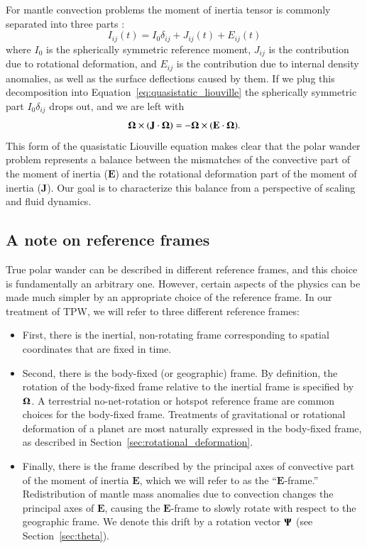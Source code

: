 \documentclass[preprint,12pt,authoryear]{elsarticle}
\newcommand{\mitbf}[1]{\hbox{\mathversion{bold}$#1$}}
\begin{document}
For mantle convection problems the moment of inertia tensor is commonly separated into three parts \citep{sabadini1981pleistocene, spada1992excitation}:
\begin{equation}
I_{ij}(t) = I_0 \delta_{ij} + J_{ij}(t) + E_{ij}(t)
\label{eq:separation}
\end{equation}
where $I_0$ is the spherically symmetric reference moment, $J_{ij}$ is the contribution due to rotational deformation, and $E_{ij}$ is the contribution due to internal density anomalies, as well as the surface deflections caused by them.
If we plug this decomposition into Equation~\eqref{eq:quasistatic_liouville} the spherically symmetric part $I_0 \delta_{ij}$ drops out, and we are left with
\begin{equation}
\mathbf{\Omega} \times (\mathbf{J} \cdot \mitbf{\Omega}) = -\mitbf{\Omega} \times ( \mathbf{E} \cdot \mitbf{\Omega} ).
\label{eq:disequilibrium}
\end{equation}
This form of the quasistatic Liouville equation makes clear that the polar wander problem represents a balance between the mismatches
of the convective part of the moment of inertia ($\mathbf{E}$) and the rotational deformation part of the moment of inertia ($\mathbf{J}$).
Our goal is to characterize this balance from a perspective of scaling and fluid dynamics.

\subsection{A note on reference frames}
\label{sec:reference_frames}
True polar wander can be described in different reference frames, and this choice is fundamentally an arbitrary one.
However, certain aspects of the physics can be made much simpler by an appropriate choice of the reference frame.
In our treatment of TPW, we will refer to three different reference frames:
\begin{itemize}
\item First, there is the inertial, non-rotating frame corresponding to spatial coordinates that are fixed in time.
\item Second, there is the body-fixed (or geographic) frame.
By definition, the rotation of the body-fixed frame relative to the inertial frame is specified by $\mitbf{\Omega}$.
A terrestrial no-net-rotation or hotspot reference frame are common choices for the body-fixed frame.
Treatments of gravitational or rotational deformation of a planet are most naturally expressed in the body-fixed frame,
as described in Section~\ref{sec:rotational_deformation}.
\item Finally, there is the frame described by the principal axes of convective part of the moment of inertia $\mathbf{E}$,
which we will refer to as the ``$\mathbf{E}$-frame.'' 
Redistribution of mantle mass anomalies due to convection changes the principal axes of $\mathbf{E}$, 
causing the $\mathbf{E}$-frame to slowly rotate with respect to the geographic frame. We denote this drift 
by a rotation vector $\mitbf{\Psi}$ (see Section~\ref{sec:theta}).
\end{itemize}
\end{document}

